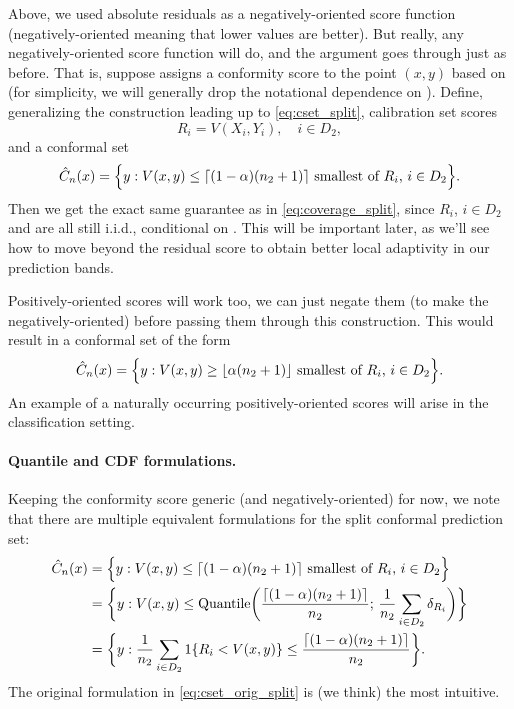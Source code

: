 \documentclass{article}
\begin{document}
Above, we used absolute residuals as a negatively-oriented score function
(negatively-oriented meaning that lower values are better). But really, any
negatively-oriented score function will do, and the argument goes through
just as before. That is, suppose  assigns
a conformity score to the point $(x,y)$ based on  (for
simplicity, we will generally drop the notational dependence on
). Define, generalizing the construction leading up to
\eqref{eq:cset_split}, calibration set scores
\[
R_i = V(X_i,Y_i), \quad i \in D_2, 
\]
and a conformal set
\[
\hat{C}_n(x) = \Big\{ y : \text{$V(x,y) \leq \lceil (1-\alpha)(n_2+1) \rceil$
  smallest of $R_i$, $i \in D_2$} \Big\}. 
\]
Then we get the exact same guarantee as in \eqref{eq:coverage_split}, since
$R_i$, $i \in D_2$ and  are all still
i.i.d., conditional on . This will be important later, as
we'll see how to move beyond the residual score to obtain better local
adaptivity in our prediction bands.        

Positively-oriented scores will work too, we can just negate them (to
make the negatively-oriented) before passing them through this
construction. This would result in a conformal set of the form
\[
\hat{C}_n(x) = \Big\{ y : \text{$V(x,y) \geq \lfloor \alpha (n_2+1) \rfloor$
  smallest of $R_i$, $i \in D_2$} \Big\}.  
\]
An example of a naturally occurring positively-oriented scores will arise in the   
classification setting.

\paragraph{Quantile and CDF formulations.}

Keeping the conformity score generic (and negatively-oriented) for now, we note
that there are multiple equivalent formulations for the split conformal
prediction set:  
\begin{align}
\label{eq:cset_orig_split}
\hat{C}_n(x) 
&= \Big\{ y : \text{$V(x,y) \leq \lceil (1-\alpha)(n_2+1) \rceil$ smallest of
  $R_i$, $i \in D_2$} \Big\} \\  
\label{eq:cset_quant_split}
&= \bigg\{ y : V(x,y) \leq \mathrm{Quantile}\bigg( \frac{\lceil (1-\alpha)(n_2+1)
  \rceil}{n_2}; \, \frac{1}{n_2} \sum_{i \in D_2} \delta_{R_i} \bigg) \bigg\} \\
\label{eq:cset_cdf_split}
&= \bigg\{ y : \frac{1}{n_2} \sum_{i \in D_2} 1\{ R_i < V(x,y) \} \leq
  \frac{\lceil (1-\alpha)(n_2+1) \rceil}{n_2} \bigg\}.   
\end{align}
The original formulation in \eqref{eq:cset_orig_split} is (we think) the most
intuitive. 
\end{document}
